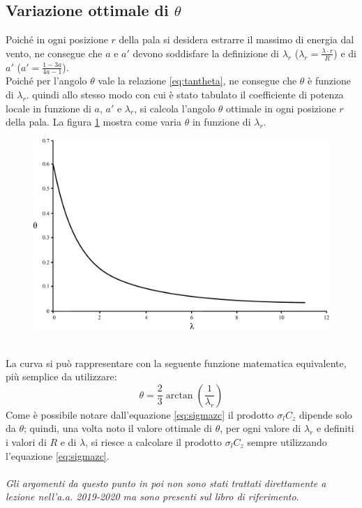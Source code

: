 \subsection{Variazione ottimale di $\theta$}
Poiché in ogni posizione $r$ della pala si desidera estrarre il massimo di energia dal vento, ne consegue che $a$ e $a'$ devono soddisfare la definizione di $\lambda_r$ ($\lambda_r = \frac{\lambda \cdot r}{R}$) e di $a'$ ($a' = \frac{1 - 3a}{4a -1}$).\\
Poiché per l'angolo $\theta$ vale la relazione \ref{eq:tantheta}, ne consegue che $\theta$ è funzione di $\lambda_r$. quindi allo stesso modo con cui è stato tabulato il coefficiente di potenza locale in funzione di $a$, $a'$ e $\lambda_r$, si calcola l'angolo $\theta$ ottimale in ogni posizione $r$ della pala. La figura \ref{fig:lambdatheta} mostra come varia $\theta$ in funzione di $\lambda_r$.
\begin{figure}[h!]
\centering
  \includegraphics[width=.7\textwidth]{fig/lambdatheta.pdf}
\caption{}
\label{fig:lambdatheta}
\end{figure}
\\La curva si può rappresentare con la seguente funzione matematica equivalente, più semplice da utilizzare:
\begin{equation}
\theta = \frac{2}{3} \arctan \left( \frac{1}{\lambda_r} \right)
\end{equation}
Come è possibile notare dall'equazione \ref{eq:sigmazc} il prodotto $\sigma_l C_z$ dipende solo da $\theta$; quindi, una volta noto il valore ottimale di $\theta$, per ogni valore di $\lambda_r$ e definiti i valori di $R$ e di $\lambda$, si riesce a calcolare il prodotto $\sigma_l C_z$ sempre utilizzando l'equazione \ref{eq:sigmazc}.\\
\\
\textit{Gli argomenti da questo punto in poi non sono stati trattati direttamente a lezione nell'a.a. 2019-2020 ma sono presenti sul libro di riferimento}.\\
